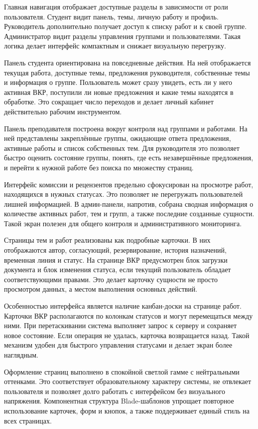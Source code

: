 \documentclass[14pt,a4paper]{extreport}
\begin{document}
Главная навигация отображает доступные разделы в зависимости от роли
пользователя.
Студент видит панель, темы, личную работу и профиль.
Руководитель дополнительно получает доступ к списку работ и к своей группе.
Администратор видит разделы управления группами и пользователями.
Такая логика делает интерфейс компактным и снижает визуальную перегрузку.

Панель студента ориентирована на повседневные действия.
На ней отображается текущая работа, доступные темы, предложения руководителя,
собственные темы и информация о группе.
Пользователь может сразу увидеть, есть ли у него активная ВКР, поступили ли
новые предложения и какие темы находятся в обработке.
Это сокращает число переходов и делает личный кабинет действительно рабочим
инструментом.

Панель преподавателя построена вокруг контроля над группами и работами.
На ней представлены закреплённые группы, ожидающие ответа предложения,
активные работы и список собственных тем.
Для руководителя это позволяет быстро оценить состояние группы, понять, где
есть незавершённые предложения, и перейти к нужной работе без поиска по
множеству страниц.

Интерфейс комиссии и рецензентов предельно сфокусирован на просмотре работ,
находящихся в нужных статусах.
Это позволяет не перегружать пользователей лишней информацией.
В админ-панели, напротив, собрана сводная информация о количестве активных
работ, тем и групп, а также последние созданные сущности.
Такой экран полезен для общего контроля и административного мониторинга.

Страницы тем и работ реализованы как подробные карточки.
В них отображаются автор, согласующий, резервирование, история назначений,
временная линия и статус.
На странице ВКР предусмотрен блок загрузки документа и блок изменения
статуса, если текущий пользователь обладает соответствующими правами.
Это делает карточку сущности не просто просмотром данных, а местом выполнения
основных действий.

Особенностью интерфейса является наличие канбан-доски на странице работ.
Карточки ВКР располагаются по колонкам статусов и могут перемещаться между
ними.
При перетаскивании система выполняет запрос к серверу и сохраняет новое
состояние.
Если операция не удалась, карточка возвращается назад.
Такой механизм удобен для быстрого управления статусами и делает экран более
наглядным.

Оформление страниц выполнено в спокойной светлой гамме с нейтральными
оттенками.
Это соответствует образовательному характеру системы, не отвлекает
пользователя и позволяет долго работать с интерфейсом без визуального
напряжения.
Компонентная структура Blade-шаблонов упрощает повторное использование
карточек, форм и кнопок, а также поддерживает единый стиль на всех страницах.
\end{document}
